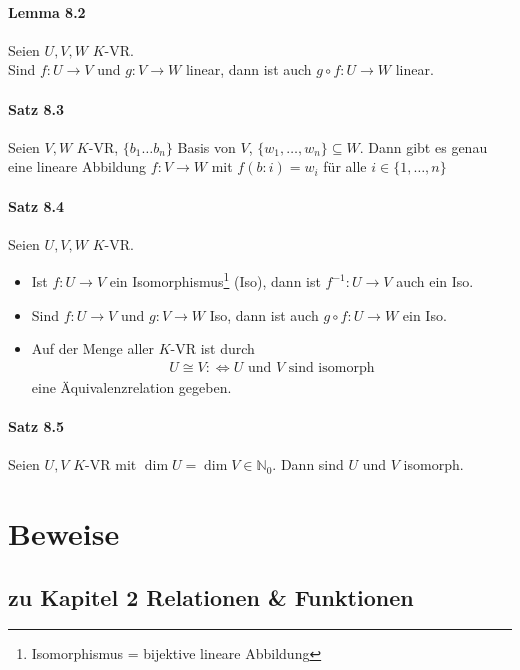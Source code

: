 \documentclass[a5paper, 10pt]{book}
\newcommand{\inN}{\in\mathbb{N}}
\begin{document}
		\subsubsection{Lemma 8.2}
			Seien $U,V,W$ $K$-VR.\\
			Sind $f: U \to V$ und $g: V \to W$ linear, dann ist auch $g \circ f: U \to W$ linear.
			
		\subsubsection{Satz 8.3}
			Seien $V,W$ $K$-VR, $\{b_1 \dots b_n\}$ Basis von $V$, $\{w_1, \dots, w_n\} \subseteq W$. Dann gibt es genau eine lineare Abbildung $f: V \to W$ mit $f(b:i) = w_i$ für alle $i \in \{1, \dots, n\}$
			
		\subsubsection{Satz 8.4}
			Seien $U, V, W$ $K$-VR.
			\begin{itemize}
				\item Ist $f: U \to V$ ein Isomorphismus\footnote{Isomorphismus = bijektive lineare Abbildung} (Iso), dann ist $f^{-1}: U \to V$ auch ein Iso.
				\item Sind $f: U \to V$ und $g: V \to W$ Iso, dann ist auch $g \circ f: U \to W$ ein Iso.
				\item Auf der Menge aller $K$-VR ist durch
					\begin{align}
						U \cong V :\Longleftrightarrow U \text{ und } V \text{ sind isomorph}
					\end{align}
					eine Äquivalenzrelation gegeben.
			\end{itemize}
		
		\subsubsection{Satz 8.5}
			Seien $U,V$ $K$-VR mit $\dim U = \dim V \inN_0$. Dann sind $U$ und $V$ isomorph.
				
					
			
	\appendix
		
	\chapter{Beweise}
		
		\iffalse
		
		\section{zu Kapitel 2 Relationen \& Funktionen}
		
\end{document}
